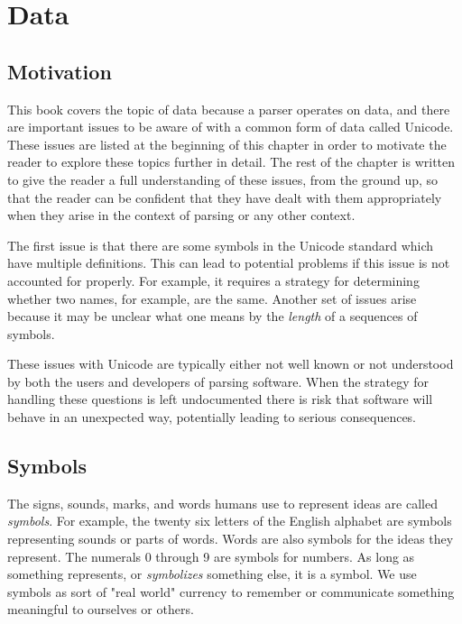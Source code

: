 \documentclass{book}
\newcommand{\newterm}[2]{\textit{#1}\index{#2}}
\begin{document}
\appendix

%
%
\chapter{Data}\label{ch.Data}

\section{Motivation}
This book covers the topic of data because a parser
operates on data, and there are important issues to be
aware of with a common form of data called Unicode.
These issues are listed at the beginning of this chapter
in order to motivate the reader to explore these topics
further in detail.
The rest of the chapter is written to give the reader a
full understanding of these issues, from the ground up,
so that the reader can be confident that they have dealt
with them appropriately when they arise in the context of
parsing or any other context.

The first issue is that there are some symbols in the Unicode standard
which have multiple definitions. This can lead to potential
problems if this issue is not accounted for properly. For example,
it requires a strategy for determining whether two names, for
example, are the same. Another set of issues arise because it may
be unclear what one means by the \textit{length} of a sequences
of symbols.

These issues with Unicode are typically either not well known or not 
understood by both the users and developers of parsing software.
When the strategy for handling these questions is left undocumented
there is risk that software will behave in an unexpected way, 
potentially leading to serious consequences.

\section{Symbols}
The signs, sounds, marks, and words humans use to represent ideas are called
\newterm{symbols}{Symbol}. For example, the twenty six letters of
the English alphabet are symbols representing sounds or parts of words. Words
are also symbols for the ideas they represent. 
The numerals 0 through 9 are symbols for numbers.
As long as something represents, or \textit{symbolizes} something else, 
it is a symbol. We use symbols as sort of "real world" currency
to remember or communicate something meaningful to ourselves or others.
\end{document}

